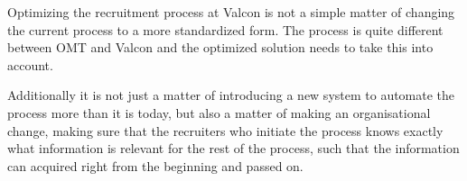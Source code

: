 Optimizing the recruitment process at Valcon is not a simple matter of changing the current process to a more standardized form.
The process is quite different between OMT and Valcon and the optimized solution needs to take this into account.

Additionally it is not just a matter of introducing a new system to automate the process more than it is today, but also a matter of making an organisational change,
making sure that the recruiters who initiate the process knows exactly what information is relevant for the rest of the process, such that the information can acquired right from the beginning and passed on.